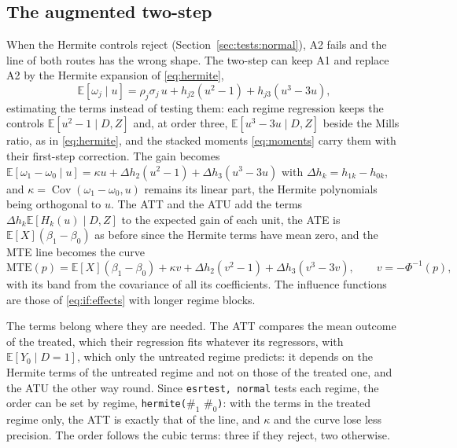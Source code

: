 \documentclass[11pt,a4paper]{article}
\theoremstyle{plain}
\theoremstyle{definition}
\theoremstyle{remark}
\newcommand{\E}{\mathbb{E}}
\newcommand{\Cov}{\operatorname{Cov}}
\newcommand{\MTE}{\mathrm{MTE}}
\newcommand{\1}{\mathbf{1}}
\newcommand{\cmd}[1]{\texttt{#1}}
\begin{document}
\subsection{The augmented two-step}\label{sec:est:augmented}

When the Hermite controls reject (Section~\ref{sec:tests:normal}), A2
fails and the line of both routes has the wrong shape. The two-step can
keep A1 and replace A2 by the Hermite expansion of \eqref{eq:hermite},
\begin{equation}\label{eq:aug}
\E[\omega_j\mid u]=\rho_j\sigma_j\,u+h_{j2}(u^2-1)+h_{j3}(u^3-3u),
\end{equation}
estimating the terms instead of testing them: each regime regression
keeps the controls $\E[u^2-1\mid D,Z]$ and, at order three,
$\E[u^3-3u\mid D,Z]$ beside the Mills ratio, as in \eqref{eq:hermite},
and the stacked moments \eqref{eq:moments} carry them with their
first-step correction. The gain becomes
$\E[\omega_1-\omega_0\mid u]=\kappa u+\Delta h_2(u^2-1)+\Delta h_3(u^3-3u)$
with $\Delta h_k=h_{1k}-h_{0k}$, and $\kappa=\Cov(\omega_1-\omega_0,u)$
remains its linear part, the Hermite polynomials being orthogonal to $u$.
The ATT and the ATU add the terms $\Delta h_k\E[H_k(u)\mid D,Z]$ to the
expected gain of each unit, the ATE is $\E[X](\beta_1-\beta_0)$ as before
since the Hermite terms have mean zero, and the MTE line becomes the curve
\begin{equation}\label{eq:mte:aug}
\MTE(p)=\E[X](\beta_1-\beta_0)+\kappa v+\Delta h_2(v^2-1)+\Delta h_3(v^3-3v),
\qquad v=-\Phi^{-1}(p),
\end{equation}
with its band from the covariance of all its coefficients. The influence
functions are those of \eqref{eq:if:effects} with longer regime blocks.

The terms belong where they are needed. The ATT compares the mean outcome
of the treated, which their regression fits whatever its regressors, with
$\E[Y_0\mid D=1]$, which only the untreated regime predicts: it depends on
the Hermite terms of the untreated regime and not on those of the treated
one, and the ATU the other way round. Since \cmd{esrtest, normal} tests
each regime, the order can be set by regime, \cmd{hermite(}$\#_1$
$\#_0$\cmd{)}: with the terms in the treated regime only, the ATT is
exactly that of the line, and $\kappa$ and the curve lose less precision.
The order follows the cubic terms: three if they reject, two otherwise.
\end{document}
